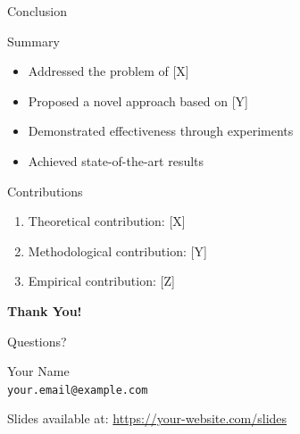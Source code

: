\documentclass[aspectratio=169]{beamer}
\begin{document}
\begin{frame}{Conclusion}
    \begin{block}{Summary}
        \begin{itemize}
            \item Addressed the problem of [X]
            \item Proposed a novel approach based on [Y]
            \item Demonstrated effectiveness through experiments
            \item Achieved state-of-the-art results
        \end{itemize}
    \end{block}
    
    \vspace{0.3cm}
    
    \begin{block}{Contributions}
        \begin{enumerate}
            \item Theoretical contribution: [X]
            \item Methodological contribution: [Y]
            \item Empirical contribution: [Z]
        \end{enumerate}
    \end{block}
\end{frame}


\begin{frame}[plain]
    \begin{center}
        \Huge{\textbf{Thank You!}}
        
        \vspace{1cm}
        
        \Large{Questions?}
        
        \vspace{1cm}
        
        \normalsize
        Your Name \\
        \texttt{your.email@example.com} \\
        
        \vspace{0.5cm}
        
        \small
        Slides available at: \url{https://your-website.com/slides}
    \end{center}
\end{frame}
\end{document}
